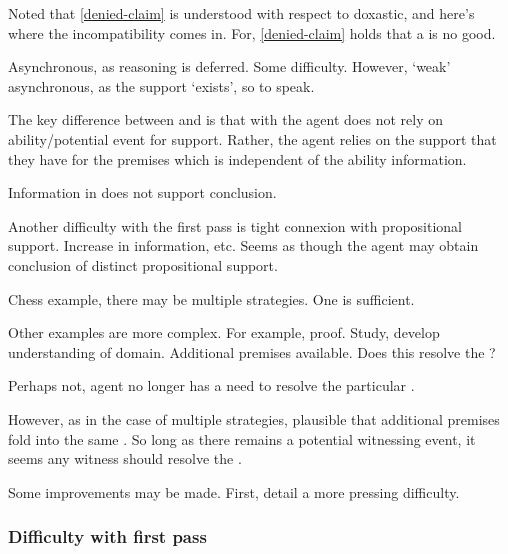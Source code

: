 \begin{note}
  Noted that \ref{denied-claim} is understood with respect to doxastic, and here's where the incompatibility comes in.
  For, \ref{denied-claim} holds that a \future{} is no good.
\end{note}

\begin{note}[Asynchronous]
  Asynchronous, as reasoning is deferred.
  Some difficulty.
  However, `weak' asynchronous, as the support `exists', so to speak.
\end{note}

\begin{note}
  The key difference between \AR{} and \WR{} is that with \WR{} the agent does not rely on ability/potential event for support.
  Rather, the agent relies on the support that they have for the premises which is independent of the ability information.

  Information in \WR{} does not support conclusion.
\end{note}

\begin{note}
  Another difficulty with the first pass is tight connexion with propositional support.
  Increase in information, etc.
  Seems as though the agent may obtain conclusion of distinct propositional support.

  Chess example, there may be multiple strategies.
  One is sufficient.

  Other examples are more complex.
  For example, proof.
  Study, develop understanding of domain.
  Additional premises available.
  Does this resolve the \future{}?

  Perhaps not, agent no longer has a need to resolve the particular \future{}.

  However, as in the case of multiple strategies, plausible that additional premises fold into the same \future{}.
  So long as there remains a potential witnessing event, it seems any witness should resolve the \future{}.

  Some improvements may be made.
  First, detail a more pressing difficulty.
\end{note}

\subsubsection{Difficulty with first pass}
\label{sec:diff-with-first}

